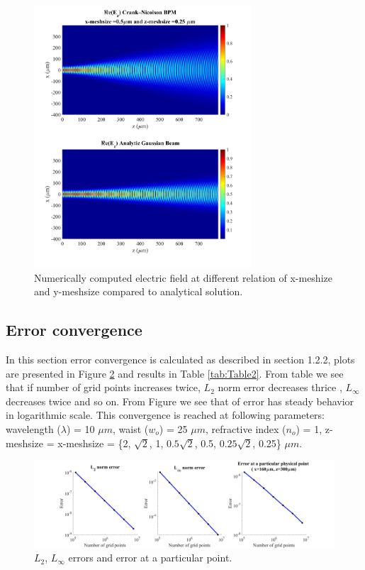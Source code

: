 \documentclass[a4paper]{article}
\begin{document}
	\begin{figure}[H]
		\hspace{-24.5mm}
		\includegraphics[width=0.725\textwidth]{change5.jpg}	
		\caption{\label{fig:Relation} Numerically computed electric field at different relation of x-meshize and y-meshsize compared to analytical solution.}
	\end{figure}
	
	\subsection{Error convergence}
	In this section error convergence is calculated as described in section 1.2.2, plots are presented in Figure \ref{fig:Error} and results in Table \ref{tab:Table2}. From table we see that if number of grid points increases twice, $L_{2}$ norm error decreases thrice , $L_{\infty}$ decreases twice and so on. From Figure we see that of error has steady behavior in logarithmic scale. This convergence is reached at following parameters: wavelength ($\lambda$) = 10 $\mu m$, waist ($w_o$) = 25 $\mu m$, refractive index ($n_o$) = 1, z-meshsize = x-meshsize  = \{2, $\sqrt{2}$, 1, $0.5\sqrt{2}$, 0.5, $0.25\sqrt{2}$, 0.25\} $\mu m$.
	\begin{figure}[H]
		\hspace{-30mm}
		\includegraphics[width=1.5\textwidth]{error.jpg}
		\caption{\label{fig:Error} $L_{2}$, $L_{\infty}$ errors and error at a particular point.}
	\end{figure}
	
\end{document}
